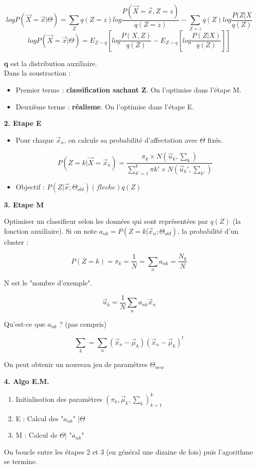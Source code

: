 \documentclass{article}
\begin{document}
\[ log P(\vec{X} = \vec{x} | \Theta) = \sum_Z q(Z = z) log \frac{P(\vec{X} = \vec{x}, Z = z)}{q(Z = z)} - \sum_{Z = z} q(Z) log \frac{P(Z | X}{q(Z)} \]
\[ log P(\vec{X} = \vec{x} | \Theta) = E_{Z \sim q} [ log \frac{P(X, Z)}{q(Z)} - E_{Z \sim q} [log \frac{P(Z | X)}{q(Z)}]  ] \]

\textbf{q} est la distribution auxiliaire. \\
Dans la soustraction : 
\begin{itemize}
\item Premier terme : \textbf{classification sachant Z}. On l'optimise dans l'étape M.
\item Deuxième terme : \textbf{réalisme}. On l'optimise dans l'étape E.
\end{itemize}

\textbf{2. Etape E}

\begin{itemize}

\item Pour chaque $\vec{x}_n$, on calcule sa probabilité d'affectation avec $\Theta$ fixés.

\[ P(Z = k | \vec{X} = \vec{x}_n) = \frac{\pi_k \times N(\vec{u}_k, \sum_k)}{\sum_{k' = 1}^{k} \pi k' \times N(\vec{u}_k', \sum_{k'})  } \]

\item Objectif : $P(Z | \vec{x}; \Theta_{old}) (fleche) q(Z)$

\end{itemize}

\textbf{3. Etape M}

Optimiser un classifieur selon les données qui sont représentées par $q(Z)$ (la fonction auxiliaire). Si on note $a_{nk} = P(Z = k | \vec{x}_n; \Theta_{old})$,
la probabilité d'un cluster :

\[ P(Z = k) = \pi_k = \frac{1}{N} = \sum_n a_{nk} = \frac{N_k}{N} \] 

N est le "nombre d'exemple".

\[ \vec{u}_k = \frac{1}{N} \sum_n a_{nk} \vec{x}_n \]

Qu'est-ce que $a_{nk}$ ? (pas compris)

\[ \sum_k = \sum_n (\vec{x}_n - \vec{\mu}_k) (\vec{x}_n - \vec{\mu}_k) ^{t}  \]

On peut obtenir un nouveau jeu de paramètres $\Theta_{new}$

\textbf{4. Algo E.M.}

\begin{enumerate}
\item Initialisation des paramètres $(\pi_k, \vec{\mu}_k, \sum_k)_{k = 1}^{k}$
\item E : Calcul des "$a_{nk}$" $ | \Theta$
\item M : Calcul de $\Theta | $ "$a_{nk}$"
\end{enumerate}

On boucle entre les étapes 2 et 3 (en général une dizaine de fois) puis l'agorithme se termine.
\end{document}
